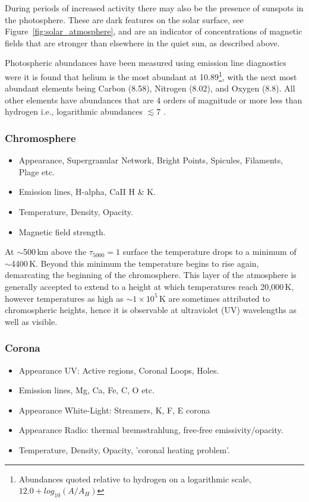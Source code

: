During periods of increased activity there may also be the presence of sunspots in the photosphere. These are dark features on the solar surface, see Figure~\ref{fig:solar_atmosphere}, and are an indicator of concentrations of magnetic fields that are stronger than elsewhere in the quiet sun, as described above. 

Photospheric abundances have been measured using emission line diagnostics were it is found that helium is the most abundant at 10.89\footnote{Abundances quoted relative to hydrogen on a logarithmic scale, $12.0+log_{10}(A/A_H)$}, with the next most abundant elements being Carbon (8.58), Nitrogen (8.02), and Oxygen (8.8). All other elements have abundances that are 4 orders of magnitude or more less than hydrogen i.e., logarithmic abundances $\lesssim7$ \citep{phillips2008}.

\subsubsection{Chromosphere}\label{sec:122}

\begin{itemize}
\item Appearance, Supergranular Network, Bright Points, Spicules, Filaments, Plage etc.
\item Emission lines, H-alpha, CaII H \& K. 
\item Temperature, Density, Opacity.
\item Magnetic field strength.
\end{itemize}

At $\sim$500\,km above the $\tau_{5000}=1$ surface the temperature drops to a minimum of $\sim$4400\,K. Beyond this minimum the temperature begins to rise again, demarcating the beginning of the chromosphere. This layer of the atmosphere is generally accepted to extend to a height at which temperatures reach 20,000\,K, however temperatures as high as $\sim1\times10^5$\,K are sometimes attributed to chromospheric heights, hence it is observable at ultraviolet (UV) wavelengths as well as visible. 

\subsubsection{Corona}\label{sec:123}

\begin{itemize}
\item Appearance UV: Active regions, Coronal Loops, Holes.
\item Emission lines, Mg, Ca, Fe, C, O etc.
\item Appearance White-Light: Streamers, K, F, E corona
\item Appearance Radio: thermal bremsstrahlung, free-free emissivity/opacity.
\item Temperature, Density, Opacity, 'coronal heating problem'.
\end{itemize}


